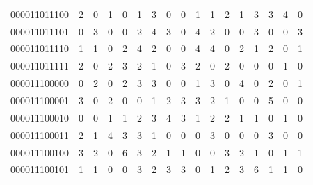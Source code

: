 \documentclass[10pt,a4paper]{article}
\begin{document}
\begin{longtable}{ |c|c|c|c|c|c|c|c|c|c|c|c|c|c|c|c|c| }
    000011011100              & 2                            & 0                                & 1                            & 0                              & 1   & 3   & 0   & 0   & 1   & 1   & 2   & 1   & 3   & 3   & 4   & 0   \\
    000011011101              & 0                            & 3                                & 0                            & 0                              & 2   & 4   & 3   & 0   & 4   & 2   & 0   & 0   & 3   & 0   & 0   & 3   \\
    000011011110              & 1                            & 1                                & 0                            & 2                              & 4   & 2   & 0   & 0   & 4   & 4   & 0   & 2   & 1   & 2   & 0   & 1   \\
    000011011111              & 2                            & 0                                & 2                            & 3                              & 2   & 1   & 0   & 3   & 2   & 0   & 2   & 0   & 0   & 0   & 1   & 0   \\
    000011100000              & 0                            & 2                                & 0                            & 2                              & 3   & 3   & 0   & 0   & 1   & 3   & 0   & 4   & 0   & 2   & 0   & 1   \\
    000011100001              & 3                            & 0                                & 2                            & 0                              & 0   & 1   & 2   & 3   & 3   & 2   & 1   & 0   & 0   & 5   & 0   & 0   \\
    000011100010              & 0                            & 0                                & 1                            & 1                              & 2   & 3   & 4   & 3   & 1   & 2   & 2   & 1   & 1   & 0   & 1   & 0   \\
    000011100011              & 2                            & 1                                & 4                            & 3                              & 3   & 1   & 0   & 0   & 0   & 3   & 0   & 0   & 0   & 3   & 0   & 0   \\
    000011100100              & 3                            & 2                                & 0                            & 6                              & 3   & 2   & 1   & 1   & 0   & 0   & 3   & 2   & 1   & 0   & 1   & 1   \\
    000011100101              & 1                            & 1                                & 0                            & 0                              & 3   & 2   & 3   & 3   & 0   & 1   & 2   & 3   & 6   & 1   & 1   & 0   \\

\end{longtable}
\end{document}
